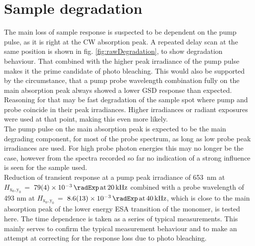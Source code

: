 \documentclass[twoside,openright,listof=numbered]{scrreprt}
\def\pumpExp#1{\ensuremath{\SI{#1}{\radExp}\,\mathrm{at}\, \SI{20}{\kilo\hertz}}}
\def\probeExp#1{\ensuremath{\SI{#1}{\radExp}\,\mathrm{at}\, \SI{40}{\kilo\hertz}}}
\def\radiantExp{\ensuremath{H_\mathrm{x_0,y_0}}}
\begin{document}
\section{Sample degradation}\label{sec:degradation}
The main loss of sample response is suspected to be dependent on the pump pulse, as it is right at the CW absorption peak. A repeated delay scan at the same position is shown in fig. \ref{fig:rawDegradation}, to show degradation behaviour. That combined with the higher peak irradiance of the pump pulse makes it the prime candidate of photo bleaching. This would also be supported by the circumstance, that a pump probe wavelength combination fully on the main absorption peak always showed a lower GSD response than expected. Reasoning for that may be fast degradation of the sample spot where pump and probe coincide in their peak irradiances. Higher irradiances or radiant exposures were used at that point, making this even more likely.\\
The pump pulse on the main absorption peak is expected to be the main degrading component, for most of the probe spectrum, as long as low probe peak irradiances are used. For high probe photon energies this may no longer be the case, however from the spectra recorded so far no indication of a strong influence is seen for the sample used.\\
Reduction of transient response at a pump peak irradiance of \qty{653}{\nano\meter} at $\radiantExp\,=\;$\pumpExp{79(4)e-3} combined with a probe wavelength of 493 nm at $\radiantExp\,=\;$\probeExp{8.6(1.3)e-3}, which is close to the main absorption peak of the lower energy ESA transition of the monomer, is tested here. The time dependence is taken as a series of typical measurements. This mainly serves to confirm the typical measurement behaviour and to make an attempt at correcting for the response loss due to photo bleaching.
\end{document}
